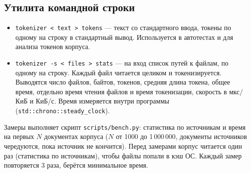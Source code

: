 \subsection{Утилита командной строки}
\begin{itemize}
    \item \texttt{tokenizer < text > tokens} --- текст со стандартного ввода, токены по одному на строку в стандартный вывод. Используется в автотестах и для анализа токенов корпуса.
    \item \texttt{tokenizer -s < files > stats} --- на вход список путей к файлам, по одному на строку. Каждый файл читается целиком и токенизируется. Выводятся число файлов, байтов, токенов, средняя длина токена, общее время, отдельно время чтения файлов и время токенизации, скорость в мкс/КиБ и КиБ/с. Время измеряется внутри программы (\texttt{std::chrono::steady\_clock}).
\end{itemize}

Замеры выполняет скрипт \texttt{scripts/bench.py}: статистика по источникам и время на первых $N$ документах корпуса ($N$ от 1000 до 1\,000\,000, документы источников чередуются, пока источник не кончится). Перед замерами корпус читается один раз (статистика по источникам), чтобы файлы попали в кэш ОС. Каждый замер повторяется 3 раза, берётся минимальное время.
